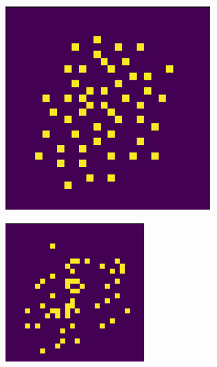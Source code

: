 \documentclass[a4paper,twocolumn]{article} %
\begin{document}
\begin{figure}[h!]
    \centering
    \begin{subfigure}[t]{0.19\linewidth}
        \includegraphics[width=\linewidth]{figures/reference_features_sa.png}
    \end{subfigure}
    \hfill
    \begin{subfigure}[t]{0.19\linewidth}
        \includegraphics[width=\linewidth]{figures/reference_features_lly.png}

\end{subfigure}
\end{figure}
\end{document}
